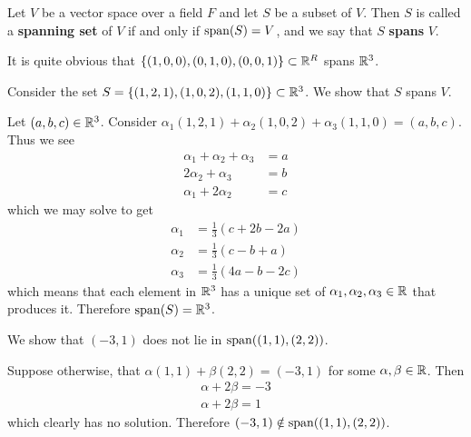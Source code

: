 \begin{definition}
    Let $V$ be a vector space over a field $F$ and let $S$ be a subset of $V$. Then $S$ is called a \textbf{spanning set} of $V$ if and only if $\mathrm{span}(S) = V$, and we say that $S$ \textbf{spans} $V$.
\end{definition}

\begin{example}
    It is quite obvious that $\{(1, 0, 0), (0, 1, 0), (0, 0, 1)\} \subset \mathbb{R}^R$ spans $\mathbb{R}^3$.
\end{example}

\begin{example}
    Consider the set $S = \{(1, 2, 1), (1, 0, 2), (1, 1, 0)\} \subset \mathbb{R}^3$. We show that $S$ spans $V$.

    Let $(a, b, c) \in \mathbb{R}^3$. Consider $\alpha_1(1, 2, 1) + \alpha_2(1, 0, 2) + \alpha_3(1, 1, 0) = (a, b, c)$. Thus we see
    \begin{align*}
        \alpha_1 + \alpha_2 + \alpha_3 &= a\\
        2\alpha_2  + \alpha_3 &= b\\
        \alpha_1 + 2\alpha_2 &= c 
    \end{align*}
    which we may solve to get
    \begin{align*}
        \alpha_1 &= \frac13(c + 2b - 2a)\\
        \alpha_2 &= \frac13(c - b + a)\\
        \alpha_3 &= \frac13(4a - b - 2c)
    \end{align*}
    which means that each element in $\mathbb{R}^3$ has a unique set of $\alpha_1, \alpha_2, \alpha_3 \in \mathbb{R}$ that produces it. Therefore $\mathrm{span}(S) = \mathbb{R}^3$.
\end{example}

\begin{example}
    We show that $(-3, 1)$ does not lie in $\mathrm{span}((1,1), (2,2))$.

    Suppose otherwise, that $\alpha(1,1) + \beta(2,2) = (-3,1)$ for some $\alpha, \beta \in \mathbb{R}$. Then
    \begin{align*}
        \alpha + 2\beta = -3\\
        \alpha + 2\beta = 1
    \end{align*}
    which clearly has no solution. Therefore $(-3, 1) \notin \mathrm{span}((1, 1), (2, 2))$.
\end{example}

